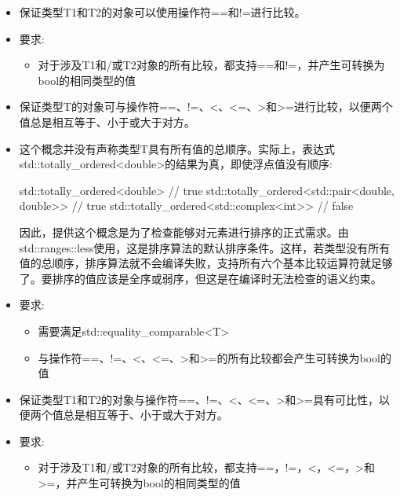 
\begin{itemize}
\item
保证类型T1和T2的对象可以使用操作符==和!=进行比较。

\item
要求:
\begin{itemize}
\item
对于涉及T1和/或T2对象的所有比较，都支持==和!=，并产生可转换为bool的相同类型的值
\end{itemize}
\end{itemize}


\begin{itemize}
\item
保证类型T的对象可与操作符==、!=、<、<=、>和>=进行比较，以便两个值总是相互等于、小于或大于对方。

\item
这个概念并没有声称类型T具有所有值的总顺序。实际上，表达式std::totally\_ordered<double>的结果为真，即使浮点值没有顺序:

\begin{cpp}
std::totally_ordered<double> // true
std::totally_ordered<std::pair<double, double>> // true
std::totally_ordered<std::complex<int>> // false
\end{cpp}

因此，提供这个概念是为了检查能够对元素进行排序的正式需求。由std::ranges::less使用，这是排序算法的默认排序条件。这样，若类型没有所有值的总顺序，排序算法就不会编译失败，支持所有六个基本比较运算符就足够了。要排序的值应该是全序或弱序，但这是在编译时无法检查的语义约束。

\item
要求:
\begin{itemize}
\item
需要满足std::equality\_comparable<T>

\item
与操作符==、!=、<、<=、>和>=的所有比较都会产生可转换为bool的值
\end{itemize}
\end{itemize}


\begin{itemize}
\item
保证类型T1和T2的对象与操作符==、!=、<、<=、>和>=具有可比性，以便两个值总是相互等于、小于或大于对方。

\item
要求:
\begin{itemize}
\item
对于涉及T1和/或T2对象的所有比较，都支持==，!=，<，<=，>和>=，并产生可转换为bool的相同类型的值
\end{itemize}
\end{itemize}



